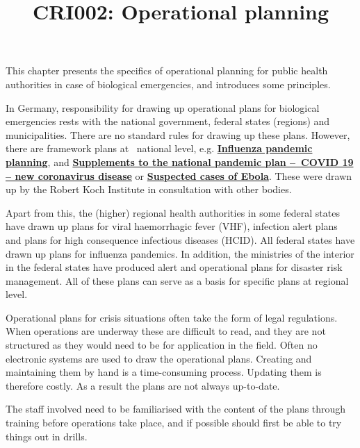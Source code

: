 \documentclass{article}
\begin{document}
\title{CRI002: Operational planning}

\maketitle


This chapter presents the specifics of operational planning for public health authorities in case of biological emergencies, and introduces some principles.


In Germany, responsibility for drawing up operational plans for biological emergencies rests with the national government, federal states (regions) and municipalities. There are no standard rules for drawing up these plans. However, there are framework plans at  national level, e.g. \textbf{\href{https://www.rki.de/DE/Content/InfAZ/I/Influenza/Pandemieplanung/Pandemieplanung_Node.html}{Influenza pandemic planning}}, and\textbf{ }\textbf{\href{https://www.rki.de/DE/Content/InfAZ/N/Neuartiges_Coronavirus/Ergaenzung_Pandemieplan_Covid.html}{Supplements to the national pandemic plan – COVID 19 – new coronavirus disease}}\textbf{ }or \textbf{\href{https://www.rki.de/DE/Content/InfAZ/E/Ebola/Rahmenkonzept_Ebola.pdf}{Suspected cases of Ebola}}.\textbf{ }These were drawn up by the Robert Koch Institute in consultation with other bodies.


Apart from this, the (higher) regional health authorities in some federal states have drawn up plans for viral haemorrhagic fever (VHF), infection alert plans and plans for high consequence infectious diseases (HCID). All federal states have drawn up plans for influenza pandemics. In addition, the ministries of the interior in the federal states have produced alert and operational plans for disaster risk management. All of these plans can serve as a basis for specific plans at regional level.


Operational plans for crisis situations often take the form of legal regulations. When operations are underway these are difficult to read, and they are not structured as they would need to be for application in the field. Often no electronic systems are used to draw the operational plans. Creating and maintaining them by hand is a time-consuming process. Updating them is therefore costly. As a result the plans are not always up-to-date.


The staff involved need to be familiarised with the content of the plans through training before operations take place, and if possible should first be able to try things out in drills.
\end{document}
